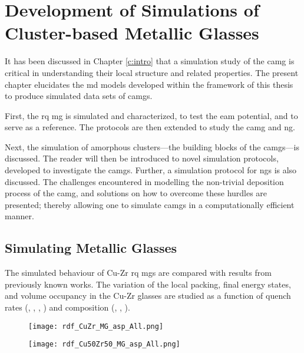 \chapter{Development of Simulations of Cluster-based Metallic Glasses} \label{c:dev}
\scdeclaration

It has been discussed in Chapter \ref{c:intro} that a simulation study of the \gls{camg} is critical in understanding their local structure and related properties. %
The present chapter elucidates the \gls{md} models developed within the framework of this thesis to produce simulated data sets of \gls{camg}s. \par

First, the \Gls{rq} \gls{mg} is simulated and characterized, to test the \gls{eam} potential, and to serve as a reference. The protocols are then extended to study the \gls{camg} and \gls{ng}. \par

Next, the simulation of amorphous clusters---the building blocks of the \gls{camg}s---is discussed. The reader will then be introduced to novel simulation protocols, developed to investigate the \gls{camg}s. Further, a simulation protocol for \gls{ng}s is also discussed.  The challenges encountered in modelling the non-trivial deposition process of the \gls{camg}, and solutions on how to overcome these hurdles are presented; thereby allowing one to simulate \gls{camg}s in a computationally efficient manner. %

\section{Simulating Metallic Glasses} \label{s:simtestMG}
The simulated behaviour of Cu-Zr \gls{rq} \gls{mg}s are compared with results from previously known works. The variation of the local packing, final energy states, and volume occupancy in the Cu-Zr glasses are studied as a function of quench rates (, , , ) and composition (\cz, \czsix, \czsf). \par

\begin{sidewaysfigure} %
	\centering
	\begin{subfigure}{\textheight} \centering \texttt{[image: rdf\_CuZr\_MG\_asp\_All.png]}
		 \end{subfigure}%
	\vfill
	\begin{subfigure}{\textheight} \centering \texttt{[image: rdf\_Cu50Zr50\_MG\_asp\_All.png]}
		 \end{subfigure}
	\label{f:rdf_mgs}
\end{sidewaysfigure}

